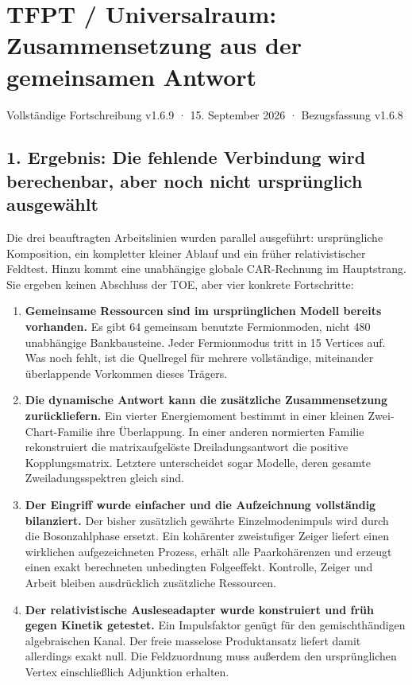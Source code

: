 

{
\setcounter{tocdepth}{2}
\tableofcontents
}
\section{TFPT / Universalraum: Zusammensetzung aus der gemeinsamen
Antwort}\label{tfpt-universalraum-zusammensetzung-aus-der-gemeinsamen-antwort}

Vollständige Fortschreibung v1.6.9 · 15. September 2026 · Bezugsfassung
v1.6.8

\subsection{1. Ergebnis: Die fehlende Verbindung wird berechenbar, aber
noch nicht ursprünglich
ausgewählt}\label{ergebnis-die-fehlende-verbindung-wird-berechenbar-aber-noch-nicht-urspruxfcnglich-ausgewuxe4hlt}

Die drei beauftragten Arbeitslinien wurden parallel ausgeführt:
ursprüngliche Komposition, ein kompletter kleiner Ablauf und ein früher
relativistischer Feldtest. Hinzu kommt eine unabhängige globale
CAR-Rechnung im Hauptstrang. Sie ergeben keinen Abschluss der TOE, aber
vier konkrete Fortschritte:

\begin{enumerate}
\def\labelenumi{\arabic{enumi}.}
\tightlist
\item
  \textbf{Gemeinsame Ressourcen sind im ursprünglichen Modell bereits
  vorhanden.} Es gibt 64 gemeinsam benutzte Fermionmoden, nicht 480
  unabhängige Bankbausteine. Jeder Fermionmodus tritt in 15 Vertices
  auf. Was noch fehlt, ist die Quellregel für mehrere vollständige,
  miteinander überlappende Vorkommen dieses Trägers.
\item
  \textbf{Die dynamische Antwort kann die zusätzliche Zusammensetzung
  zurückliefern.} Ein vierter Energiemoment bestimmt in einer kleinen
  Zwei-Chart-Familie ihre Überlappung. In einer anderen normierten
  Familie rekonstruiert die matrixaufgelöste Dreiladungsantwort die
  positive Kopplungsmatrix. Letztere unterscheidet sogar Modelle, deren
  gesamte Zweiladungsspektren gleich sind.
\item
  \textbf{Der Eingriff wurde einfacher und die Aufzeichnung vollständig
  bilanziert.} Der bisher zusätzlich gewährte Einzelmodenimpuls wird
  durch die Bosonzahlphase ersetzt. Ein kohärenter zweistufiger Zeiger
  liefert einen wirklichen aufgezeichneten Prozess, erhält alle
  Paarkohärenzen und erzeugt einen exakt berechneten unbedingten
  Folgeeffekt. Kontrolle, Zeiger und Arbeit bleiben ausdrücklich
  zusätzliche Ressourcen.
\item
  \textbf{Der relativistische Ausleseadapter wurde konstruiert und früh
  gegen Kinetik getestet.} Ein Impulsfaktor genügt für den
  gemischthändigen algebraischen Kanal. Der freie masselose
  Produktansatz liefert damit allerdings exakt null. Die Feldzuordnung
  muss außerdem den ursprünglichen Vertex einschließlich Adjunktion
  erhalten.
\end{enumerate}

